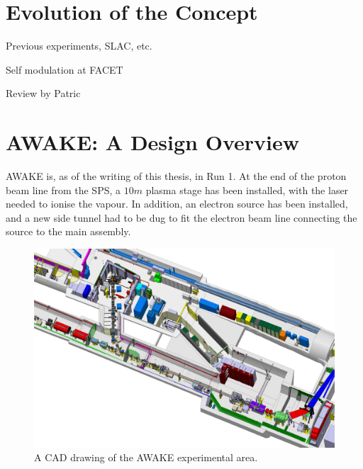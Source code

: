 \section{Evolution of the Concept}
\label{WFA:History}

Previous experiments, SLAC, etc.

\cite{rosenzweig:1988, blumenfeld:2007, kallos:2008, litos:2014}

Self modulation at FACET \cite{adli:2016}

Review by Patric \cite{muggli:2009}

\section{AWAKE: A Design Overview}
\label{WFA:Design}

AWAKE is, as of the writing of this thesis, in Run 1. At the end of the proton beam line from the SPS, a $10\unit{m}$ plasma stage has been installed, with the laser needed to ionise the vapour. In addition, an electron source has been installed, and a new side tunnel had to be dug to fit the electron beam line connecting the source to the main assembly.

\begin{figure}[hbt]
    \centering
    \includegraphics[width=0.99\linewidth,trim={0mm 0mm 0mm 0mm},clip]{figures/AwakeExperiment}
    \caption{\label{Fig:WFA:AWAKE} A CAD drawing of the AWAKE experimental area.}
\end{figure}

